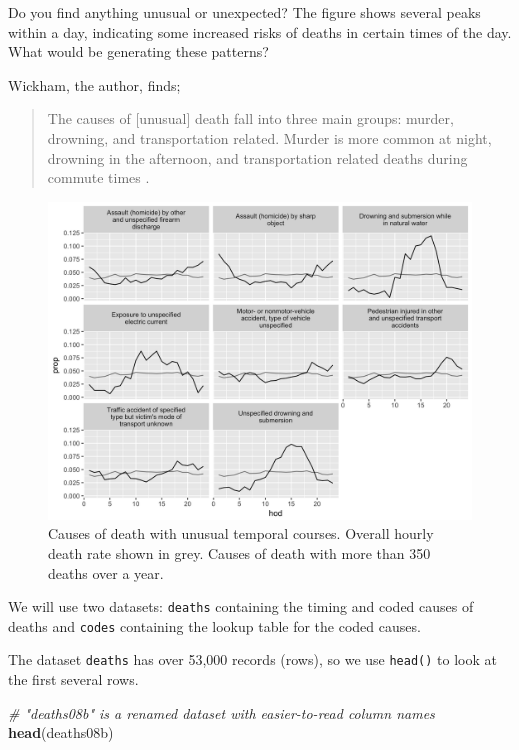 \documentclass[]{book}
\newenvironment{Shaded}{\begin{snugshade}}{\end{snugshade}}
\newcommand{\KeywordTok}[1]{\textcolor[rgb]{0.13,0.29,0.53}{\textbf{{#1}}}}
\newcommand{\CommentTok}[1]{\textcolor[rgb]{0.56,0.35,0.01}{\textit{{#1}}}}
\newcommand{\NormalTok}[1]{{#1}}
\theoremstyle{definition}
\theoremstyle{definition}
\theoremstyle{remark}
\begin{document}
Do you find anything unusual or unexpected? The figure shows several
peaks within a day, indicating some increased risks of deaths in certain
times of the day. What would be generating these patterns?

Wickham, the author, finds;

\begin{quote}
The causes of {[}unusual{]} death fall into three main groups: murder,
drowning, and transportation related. Murder is more common at night,
drowning in the afternoon, and transportation related deaths during
commute times \citep{Wickham2014}.
\end{quote}

\begin{figure}
\includegraphics[width=1\linewidth]{tidy_case_study/unusual-big} \caption{Causes of death with unusual temporal courses. Overall hourly death rate shown in grey. Causes of death with more than 350 deaths over a year.}\label{fig:unusual-big}
\end{figure}

We will use two datasets: \texttt{deaths} containing the timing and
coded causes of deaths and \texttt{codes} containing the lookup table
for the coded causes.

The dataset \texttt{deaths} has over 53,000 records (rows), so we use
\texttt{head()} to look at the first several rows.

\begin{Shaded}
\begin{Highlighting}[]
\CommentTok{# "deaths08b" is a renamed dataset with easier-to-read column names }
\KeywordTok{head}\NormalTok{(deaths08b) }
\end{Highlighting}
\end{Shaded}
\end{document}
